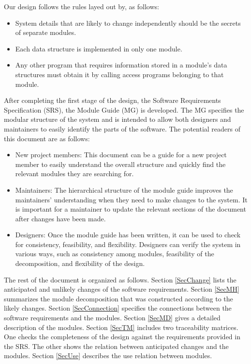 \documentclass[12pt, titlepage]{article}
\begin{document}
Our design follows the rules layed out by, as follows:
\begin{itemize}
\item System details that are likely to change independently should be the
  secrets of separate modules.
\item Each data structure is implemented in only one module.
\item Any other program that requires information stored in a module's data
  structures must obtain it by calling access programs belonging to that module.
\end{itemize}

After completing the first stage of the design, the Software Requirements
Specification (SRS), the Module Guide (MG) is developed. The MG
specifies the modular structure of the system and is intended to allow both
designers and maintainers to easily identify the parts of the software.  The
potential readers of this document are as follows:

\begin{itemize}
\item New project members: This document can be a guide for a new project member
  to easily understand the overall structure and quickly find the
  relevant modules they are searching for.
\item Maintainers: The hierarchical structure of the module guide improves the
  maintainers' understanding when they need to make changes to the system. It is
  important for a maintainer to update the relevant sections of the document
  after changes have been made.
\item Designers: Once the module guide has been written, it can be used to
  check for consistency, feasibility, and flexibility. Designers can verify the
  system in various ways, such as consistency among modules, feasibility of the
  decomposition, and flexibility of the design.
\end{itemize}

The rest of the document is organized as follows. Section
\ref{SecChange} lists the anticipated and unlikely changes of the software
requirements. Section \ref{SecMH} summarizes the module decomposition that
was constructed according to the likely changes. Section \ref{SecConnection}
specifies the connections between the software requirements and the
modules. Section \ref{SecMD} gives a detailed description of the
modules. Section \ref{SecTM} includes two traceability matrices. One checks
the completeness of the design against the requirements provided in the SRS. The
other shows the relation between anticipated changes and the modules. Section
\ref{SecUse} describes the use relation between modules.
\end{document}
